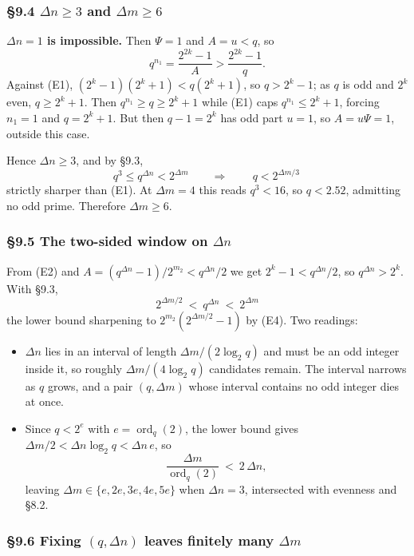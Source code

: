 \documentclass[11pt]{article}
\begin{document}
\subsubsection*{\S9.4 $\Delta n \geq 3$ and $\Delta m \geq 6$}

\noindent\textbf{$\Delta n = 1$ is impossible.} Then $\Psi = 1$ and $A = u < q$, so
\[
q^{n_1} = \frac{2^{2k}-1}{A} > \frac{2^{2k}-1}{q} .
\]
Against (E1), $\left(2^{k}-1\right)\left(2^{k}+1\right) < q\left(2^{k}+1\right)$, so $q > 2^{k}-1$; as $q$ is odd and $2^{k}$ even, $q \geq 2^{k}+1$. Then $q^{n_1} \geq q \geq 2^{k}+1$ while (E1) caps $q^{n_1} \leq 2^{k}+1$, forcing $n_1 = 1$ and $q = 2^{k}+1$. But then $q-1 = 2^{k}$ has odd part $u = 1$, so $A = u\Psi = 1$, outside this case.

Hence $\Delta n \geq 3$, and by \S9.3,
\[
q^{3} \leq q^{\Delta n} < 2^{\Delta m} \qquad\Longrightarrow\qquad \boxed{\,q < 2^{\Delta m/3}\,}
\]
strictly sharper than (E1). At $\Delta m = 4$ this reads $q^{3} < 16$, so $q < 2.52$, admitting no odd prime. Therefore $\Delta m \geq 6$.

\subsubsection*{\S9.5 The two-sided window on $\Delta n$}

From (E2) and $A = \left(q^{\Delta n}-1\right)/2^{m_2} < q^{\Delta n}/2$ we get $2^{k}-1 < q^{\Delta n}/2$, so $q^{\Delta n} > 2^{k}$. With \S9.3,
\[
\boxed{\,2^{\Delta m/2} \ < \ q^{\Delta n} \ < \ 2^{\Delta m}\,}
\]
the lower bound sharpening to $2^{m_2}\!\left(2^{\Delta m/2}-1\right)$ by (E4). Two readings:
\begin{itemize}
\item $\Delta n$ lies in an interval of length $\Delta m/\!\left(2\log_2 q\right)$ and must be an odd integer inside it, so roughly $\Delta m/\!\left(4\log_2 q\right)$ candidates remain. The interval narrows as $q$ grows, and a pair $(q,\Delta m)$ whose interval contains no odd integer dies at once.
\item Since $q < 2^{e}$ with $e = \operatorname{ord}_q(2)$, the lower bound gives $\Delta m/2 < \Delta n \log_2 q < \Delta n\,e$, so
\[
\frac{\Delta m}{\operatorname{ord}_q(2)} \ < \ 2\,\Delta n ,
\]
leaving $\Delta m \in \{e, 2e, 3e, 4e, 5e\}$ when $\Delta n = 3$, intersected with evenness and \S8.2.
\end{itemize}

\subsubsection*{\S9.6 Fixing $(q,\Delta n)$ leaves finitely many $\Delta m$}
\end{document}

